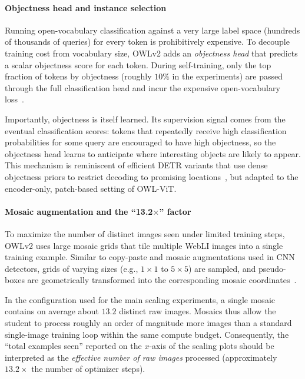\begin{enrichment}
\begin{enrichment}
		\paragraph{Objectness head and instance selection}
		Running open-vocabulary classification against a very large label space (hundreds of thousands of queries) for every token is prohibitively expensive.
		To decouple training cost from vocabulary size, OWLv2 adds an \emph{objectness head} that predicts a scalar objectness score for each token.
		During self-training, only the top fraction of tokens by objectness (roughly \(10\%\) in the experiments) are passed through the full classification head and incur the expensive open-vocabulary loss~\cite{minderer2024_owlvitv2}.
		
		Importantly, objectness is itself learned.
		Its supervision signal comes from the eventual classification scores: tokens that repeatedly receive high classification probabilities for some query are encouraged to have high objectness, so the objectness head learns to anticipate where interesting objects are likely to appear.
		This mechanism is reminiscent of efficient DETR variants that use dense objectness priors to restrict decoding to promising locations~\cite{yao2021_efficientdetr}, but adapted to the encoder-only, patch-based setting of OWL-ViT.
		
		\paragraph{Mosaic augmentation and the ``13.2$\times$'' factor}
		To maximize the number of distinct images seen under limited training steps, OWLv2 uses large mosaic grids that tile multiple WebLI images into a single training example.
		Similar to copy-paste and mosaic augmentations used in CNN detectors, grids of varying sizes (e.g., $1\times 1$ to $5\times 5$) are sampled, and pseudo-boxes are geometrically transformed into the corresponding mosaic coordinates~\cite{minderer2024_owlvitv2}.
		
		In the configuration used for the main scaling experiments, a single mosaic contains on average about $13.2$ distinct raw images.
		Mosaics thus allow the student to process roughly an order of magnitude more images than a standard single-image training loop within the same compute budget.
		Consequently, the ``total examples seen'' reported on the $x$-axis of the scaling plots should be interpreted as the \emph{effective number of raw images} processed (approximately $13.2\times$ the number of optimizer steps).
		

\end{enrichment}
\end{enrichment}
